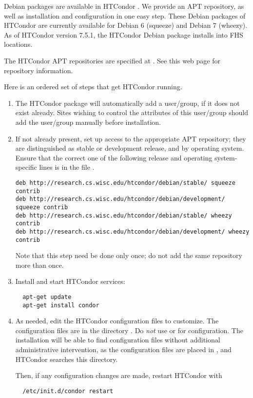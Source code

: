 Debian packages are available in HTCondor \VersionNotice.
We provide an APT repository, as well as 
installation and configuration in one easy step.
These Debian packages of HTCondor are currently available for 
Debian 6 (squeeze) and Debian 7 (wheezy).
As of HTCondor version 7.5.1, 
the HTCondor Debian package installs into FHS locations.

The HTCondor APT repositories are specified at
  .
See this web page for repository information.

Here is an ordered set of steps that get HTCondor running.
\begin{enumerate}
\item The HTCondor package will automatically add a  user/group,
if it does not exist already.
Sites wishing to control the attributes of this user/group 
should add the  user/group manually before installation.

\item If not already present,
set up access to the appropriate APT repository;
they are distinguished as stable or development release,
and by operating system. 
Ensure that the correct one of the following release and 
operating system-specific lines is in 
the file  .
\footnotesize
\begin{verbatim}
deb http://research.cs.wisc.edu/htcondor/debian/stable/ squeeze contrib
deb http://research.cs.wisc.edu/htcondor/debian/development/ squeeze contrib
deb http://research.cs.wisc.edu/htcondor/debian/stable/ wheezy contrib
deb http://research.cs.wisc.edu/htcondor/debian/development/ wheezy contrib
\end{verbatim}
\normalsize
Note that this step need be done only once;
do not add the same repository more than once.

\item Install and start HTCondor services:
\begin{verbatim}
  apt-get update
  apt-get install condor
\end{verbatim}

\item As needed, edit the HTCondor configuration files to customize.
The configuration files are in the directory  .
Do \emph{not} use  or  for configuration.
The installation will be able to find configuration files without
additional administrative intervention,
as the configuration files are placed in ,
and HTCondor searches this directory.

Then, if any configuration changes are made, restart HTCondor with
\begin{verbatim}
  /etc/init.d/condor restart
\end{verbatim}

\end{enumerate}

